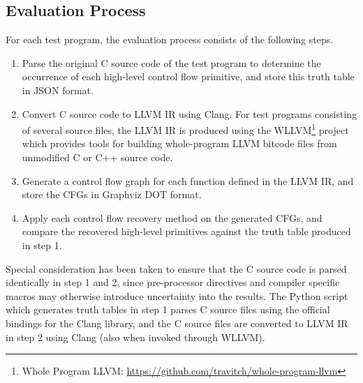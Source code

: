
\subsection{Evaluation Process}

For each test program, the evaluation process consists of the following steps.

\begin{enumerate}
	\item Parse the original C source code of the test program to determine the occurrence of each high-level control flow primitive, and store this truth table in JSON format.
	\item Convert C source code to LLVM IR using Clang. For test programs consisting of several source files, the LLVM IR is produced using the WLLVM\footnote{Whole Program LLVM: \url{https://github.com/travitch/whole-program-llvm}} project which provides tools for building whole-program LLVM bitcode files from unmodified C or C++ source code.
	\item Generate a control flow graph for each function defined in the LLVM IR, and store the CFGs in Graphviz DOT format.
	\item Apply each control flow recovery method on the generated CFGs, and compare the recovered high-level primitives against the truth table produced in step 1.
\end{enumerate}

Special consideration has been taken to ensure that the C source code is parsed identically in step 1 and 2, since pre-processor directives and compiler specific macros may otherwise introduce uncertainty into the results. The Python script which generates truth tables in step 1 parses C source files using the official bindings for the Clang library, and the C source files are converted to LLVM IR in step 2 using Clang (also when invoked through WLLVM).
